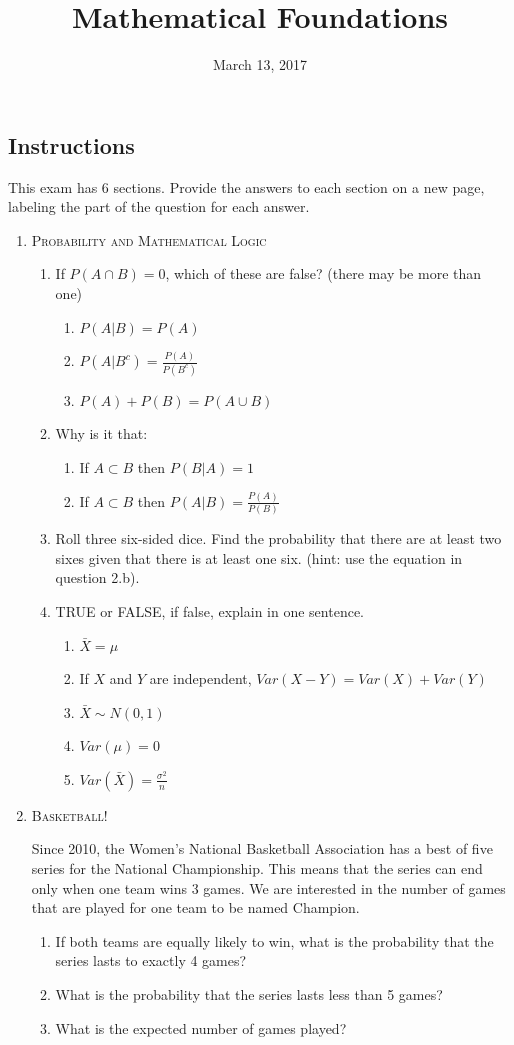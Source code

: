 \documentclass[11pt,letterpaper]{article}
\title{Mathematical Foundations}
\date{March 13, 2017}
\numberwithin{equation}{section}
\begin{document}
\maketitle
\subsection*{Instructions}
This exam has 6 sections.  Provide the answers to each section on a new page, labeling the part of the question for each answer.  
\begin{enumerate}[I]
\item \textsc{Probability and Mathematical Logic }
\begin{enumerate}[1)]
\item If $P(A\cap B)=0$, which of these are false? (there may be more than one)
\begin{enumerate}
\item[a)] $P(A|B)=P(A)$
\item[b)] $P(A|B^c)=\frac{P(A)}{P(B^c)}$
\item[c)] $P(A)+P(B)=P(A\cup B)$
\end{enumerate}
\item  Why is it that: 
\begin{enumerate}
\item[a)] If $A \subset B$ then $P(B|A) = 1$ 
\item[b)] If $A \subset B$ then $P(A|B) = \frac{P(A)}{P(B)}$
\end{enumerate}
\item Roll three six-sided dice. Find the probability that there are at least two sixes given that there is at least one six. (hint: use the equation in question 2.b).
\item TRUE or FALSE, if false, explain in one sentence.
\begin{enumerate}
\item[a)] $\bar{X}=\mu$
\item[b)] If $X$ and $Y$ are independent, $Var(X-Y)=Var(X)+Var(Y)$
\item[c)] $\bar{X}\sim N(0,1)$
\item[d)] $Var(\mu)=0$
\item[e)] $Var(\bar{X})=\frac{\sigma^2}{n}$
\end{enumerate}

\end{enumerate}
\pagebreak
\item \textsc{Basketball!} 

Since 2010, the Women's National Basketball Association has a best of five series for the National Championship.  This means that the series can end only when one team wins 3 games.  We are interested in the number of games that are played for one team to be named Champion.
\begin{enumerate}[1)]
\item If both teams are equally likely to win, what is the probability that the series lasts to exactly 4 games?
\item What is the probability that the series lasts less than 5 games?
\item What is the expected number of games played? 
\end{enumerate}



\end{enumerate}
\end{document}
